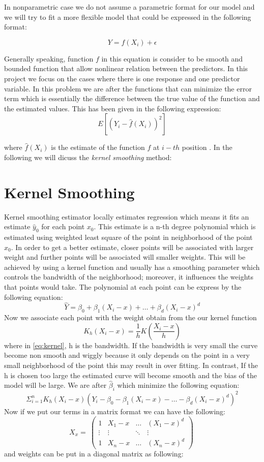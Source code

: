 \documentclass[12pt,twoside, a4paper]{reedthesis}
\begin{document}
In nonparametric case we do not assume a parametric format for our model and we will try to fit a more flexible model that could be expressed in the following format:

\[Y= f(X_{i})+\epsilon\]

Generally speaking, function \(f\) in this equation is consider to be smooth and bounded function that allow nonlinear relation between the predictors. In this project we focus on the cases where there is one response and one predictor variable. In this problem we are after the functions that can minimize the error term which is essentially the difference between the true value of the function and the estimated values. This has been given in the following expression:
\[E[(Y_i -\hat f(X_{i}))^{2}]\]

where \(\hat f(X_{i})\) is the estimate of the function \(f\) at \(i-th\) position . In the following we will dicuss the \emph{kernel smoothing} method:

\hypertarget{kernel-smoothing}{%
\section{Kernel Smoothing}\label{kernel-smoothing}}

Kernel smoothing estimator locally estimates regression which means it fits an estimate \(\hat y_0\) for each point \(x_0\). This estimate is a n-th degree polynomial which is estimated using weighted least square of the point in neighborhood of the point \(x_0\). In order to get a better estimate, closer points will be associated with larger weight and further points will be associated will smaller weights.
This will be achieved by using a kernel function and usually has a smoothing parameter which controls the bandwidth of the neighborhood; moreover, it influences the weights that points would take. The polynomial at each point can be express by the following equation:
\begin{equation}
\hat Y=\beta_0+\beta_1(X_i-x)+\dots+\beta_d(X_i-x)^d
\label{eq:poly}
\end{equation}
Now we associate each point with the weight obtain from the our kernel function
\begin{equation}
K_h(X_i-x)=\frac{1}{h}K(\frac{X_i-x}{h})
\label{eq:kernel}
\end{equation}
where in \eqref{eq:kernel}, h is the bandwidth. If the bandwidth is very small the curve become non smooth and wiggly because it only depends on the point in a very small neighborhood of the point this may result in over fitting. In contrast, If the h is chosen too large the estimated curve will become smooth and the bias of the model will be large. We are after \(\hat\beta_i\) which minimize the following equation:
\[\Sigma^n_{i=1}K_h(X_i-x)(Y_i-\beta_0-\beta_1(X_i-x)-\dots-\beta_d(X_i-x)^d)^2\]
Now if we put our terms in a matrix format we can have the following:
\[X_x=
\
 \begin{pmatrix}
  1 & X_1-x & \dots& (X_1-x)^d \\
  \vdots & \vdots &\ddots & \vdots \\
  1 & X_n-x & \dots & (X_n-x)^d
 \end{pmatrix}
\
\]
and weights can be put in a diagonal matrix as following:
\end{document}
